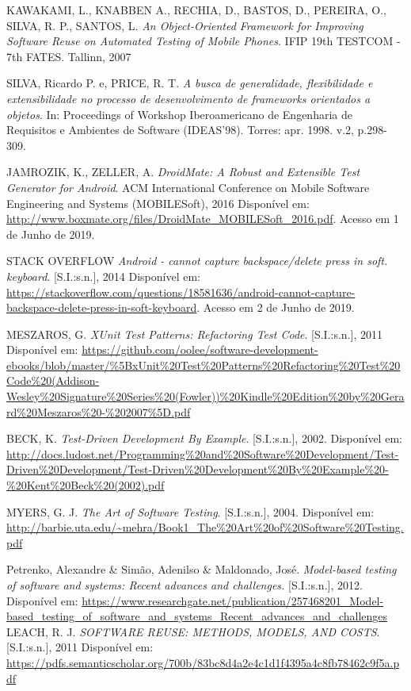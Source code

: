 \documentclass[
    12pt,       %
    openright,      %
    twoside,      %
    a4paper,      %
    english,      %
    french,       %
    spanish,      %
    brazil,       %
    ]{abntex2}
\begin{document}
  \noindent
  KAWAKAMI, L., KNABBEN A., RECHIA, D., BASTOS, D., PEREIRA, O., SILVA, R. P., SANTOS, L. \textit{An Object-Oriented Framework for Improving Software Reuse on Automated Testing of Mobile Phones}. IFIP 19th TESTCOM - 7th FATES. Tallinn, 2007

  \noindent
  SILVA, Ricardo P. e, PRICE, R. T. \textit{A busca de generalidade, flexibilidade e extensibilidade no processo de desenvolvimento de frameworks orientados a objetos}.
  In: Proceedings of Workshop Iberoamericano de Engenharia de Requisitos e Ambientes de Software (IDEAS'98). Torres: apr. 1998. v.2, p.298-309.

  \noindent
  JAMROZIK, K., ZELLER, A.  \textit{DroidMate: A Robust and Extensible Test Generator
  for Android}. ACM International Conference on Mobile Software Engineering and Systems (MOBILESoft), 2016 Disponível em: \url{http://www.boxmate.org/files/DroidMate_MOBILESoft_2016.pdf}. Acesso em 1 de Junho de 2019.

  \noindent
  STACK OVERFLOW \textit{Android - cannot capture backspace/delete press in soft. keyboard}. [S.I.:s.n.], 2014 Disponível em:
  \url{https://stackoverflow.com/questions/18581636/android-cannot-capture-backspace-delete-press-in-soft-keyboard}. Acesso em 2 de Junho de 2019.

  \noindent
  MESZAROS, G. \textit{XUnit Test Patterns: Refactoring Test Code}. [S.I.:s.n.], 2011 Disponível em:
  \url{https://github.com/oolee/software-development-ebooks/blob/master/\%5BxUnit\%20Test\%20Patterns\%20Refactoring\%20Test\%20Code\%20(Addison-Wesley\%20Signature\%20Series\%20(Fowler))\%20Kindle\%20Edition\%20by\%20Gerard\%20Meszaros\%20-\%202007\%5D.pdf}

  \noindent
  BECK, K. \textit{Test-Driven Development By Example}. [S.I.:s.n.], 2002. Disponível em:
  \url{http://docs.ludost.net/Programming\%20and\%20Software\%20Development/Test-Driven\%20Development/Test-Driven\%20Development\%20By\%20Example\%20-\%20Kent\%20Beck\%20(2002).pdf}

  \noindent
  MYERS, G. J. \textit{The Art of Software Testing}. [S.I.:s.n.], 2004. Disponível em:
  \url{http://barbie.uta.edu/~mehra/Book1_The\%20Art\%20of\%20Software\%20Testing.pdf}

  \noindent
  Petrenko, Alexandre \& Simão, Adenilso \& Maldonado, José. \textit{Model-based testing of software and systems: Recent advances and challenges.} [S.I.:s.n.], 2012. Disponível em:
  \url{https://www.researchgate.net/publication/257468201_Model-based_testing_of_software_and_systems_Recent_advances_and_challenges}
  \noindent
  LEACH, R. J. \textit{SOFTWARE REUSE: METHODS, MODELS, AND COSTS}. [S.I.:s.n.], 2011 Disponível em:
  \url{https://pdfs.semanticscholar.org/700b/83bc8d4a2e4c1d1f4395a4c8fb78462c9f5a.pdf}
\end{document}
